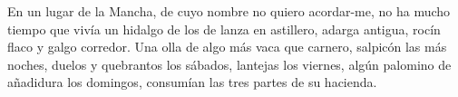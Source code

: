 En un lugar de la Mancha, de cuyo nombre no quiero acordar-me, no ha
mucho tiempo que vivía un hidalgo de los de lanza en astillero, adarga
antigua, rocín flaco y galgo corredor. Una olla de algo más vaca que
carnero, salpicón las más noches, duelos y quebrantos los sábados,
lantejas los viernes, algún palomino de añadidura los domingos,
consumían las tres partes de su hacienda.
